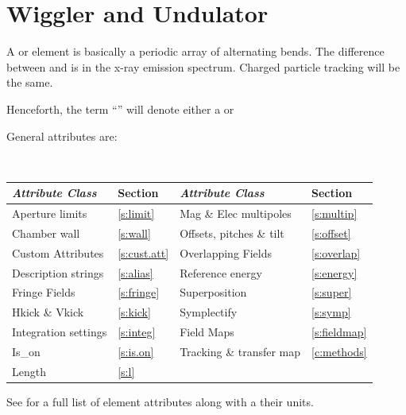 {%
\section{Wiggler and Undulator} 
\label{s:wiggler}

A  or  element is basically a periodic array of alternating bends.
The difference between  and  is in the x-ray emission spectrum.
Charged particle tracking will be the same. 

Henceforth, the term ``'' will denote either a  or 

General  attributes are:
\begin{center}
\tt
\begin{tabular}{llll} \toprule
  {\sl Attribute Class}      & Section           & {\sl Attribute Class}      & Section            \\ \midrule
  Aperture limits            & \ref{s:limit}     & Mag \& Elec multipoles     & \ref{s:multip}     \\
  Chamber wall               & \ref{s:wall}      & Offsets, pitches \& tilt   & \ref{s:offset}     \\
  Custom Attributes          & \ref{s:cust.att}  & Overlapping Fields         & \ref{s:overlap}    \\
  Description strings        & \ref{s:alias}     & Reference energy           & \ref{s:energy}     \\ 
  Fringe Fields              & \ref{s:fringe}    & Superposition              & \ref{s:super}      \\
  Hkick \& Vkick             & \ref{s:kick}      & Symplectify                & \ref{s:symp}       \\
  Integration settings       & \ref{s:integ}     & Field Maps                 & \ref{s:fieldmap}   \\
  Is_on                      & \ref{s:is.on}     & Tracking \& transfer map   & \ref{c:methods}    \\ 
  Length                     & \ref{s:l}         &                            &                    \\ 
  \bottomrule
\end{tabular}
\end{center}
\toffset
See  for a full list of element attributes along with a their units.

}
